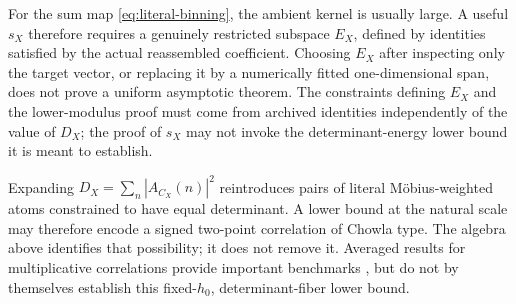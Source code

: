 \begin{remark}
For the sum map \eqref{eq:literal-binning}, the ambient kernel is
usually large.  A useful \(s_X\) therefore requires a genuinely
restricted subspace \(E_X\), defined by identities satisfied by the
actual reassembled coefficient.  Choosing \(E_X\) after inspecting
only the target vector, or replacing it by a numerically fitted
one-dimensional span, does not prove a uniform asymptotic theorem.
The constraints defining \(E_X\) and the lower-modulus proof must
come from archived identities independently of the value of \(D_X\);
the proof of \(s_X\) may not invoke the determinant-energy lower bound
it is meant to establish.
\end{remark}

\begin{remark}
Expanding \(D_X=\sum_n|A_{C_X}(n)|^2\) reintroduces pairs of literal
M\"obius-weighted atoms constrained to have equal determinant.  A
lower bound at the natural scale may therefore encode a signed
two-point correlation of Chowla type.  The algebra above identifies
that possibility; it does not remove it.  Averaged results for
multiplicative correlations provide important benchmarks
\citep{MatomakiRadziwillTao2015,Tao2016LogChowla}, but do not by
themselves establish this fixed-\(h_0\), determinant-fiber lower
bound.
\end{remark}
